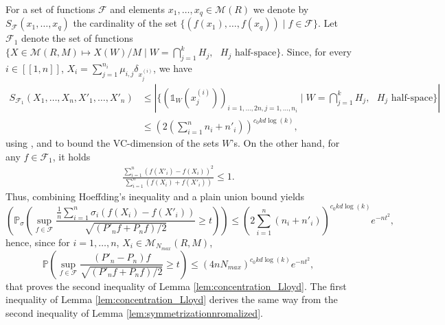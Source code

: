 \documentclass[noinfoline,preprint]{article}
\renewcommand{\1}{\mathds 1}
\begin{document}
For a set of functions $\mathcal{F}$ and elements $x_1, \hdots, x_q \in \mathcal{M}(R)$ we denote by $S_{\mathcal{F}}(x_1, \hdots, x_q)$ the cardinality of the set $\{ (f(x_1), \hdots, f(x_q))\mid f \in \mathcal{F} \}$.  Let $\mathcal{F}_1$ denote the set of functions $\{X \in \mathcal{M}(R,M) \mapsto X(W)/M \mid W= \bigcap_{j=1}^k H_j, \mbox{ $H_j$ half-space} \}$. Since, for every $i \in [\![1,n]\!]$, $X_i = \sum_{j=1}^{n_i} \mu_{i,j} \delta_{x^{(i)}_j}$, we have 
\begin{align*}
S_{\mathcal{F}_1}(X_1, \hdots, X_n, X'_1, \hdots, X'_n) & \leq |\{(\mathds{1}_W(x^{(i)}_j))_{i=1, \hdots, 2n, j=1, \hdots, n_i} \mid W= \bigcap_{j=1}^k H_j, \mbox{ $H_j$ half-space} \}| \\ 
& \leq \left ( 2 \left ( \sum_{i=1}^n n_i + n'_i \right ) \right )^{c_0 kd \log(k)},
\end{align*}
using \cite[Theorem 1]{Mendelson03}, and \cite[Theorem 1]{vanderVaart09} to bound the VC-dimension of the sets $W$'s. On the other hand, for any $f \in \mathcal{F}_1$, it holds
\begin{align*}
\frac{\sum_{i=1}^n (f(X'_i) - f(X_i))^2}{\sum_{i=1}^n (f(X_i) + f(X'_i))} \leq 1. 
\end{align*}
Thus, combining Hoeffding's inequality and a plain union bound yields
\[
\left ( \mathbb{P}_{\sigma} \left ( \sup_{f \in \mathcal{F} } \frac{\frac{1}{n} \sum_{i=1}^n{\sigma_i (f(X_i) - f(X'_i))}}{\sqrt{(P'_n f + P_nf)/2}} \geq t \right ) \right ) \leq \left ( 2 \sum_{i=1}^n(n_i + n'_i) \right )^{c_0 kd \log(k)} e^{-nt^2},
\]
hence, since for $i=1, \hdots, n$, $X_i \in \mathcal{M}_{N_{max}}(R,M)$,
\[
\mathbb{P} \left ( \sup_{f \in \mathcal{F} } \frac{(P'_n-P_n)f}{\sqrt{(P'_n f + P_nf)/2}} \geq t \right ) \leq (4 n N_{max})^{c_0 kd \log(k)} e^{-nt^2},
\]
that proves the second inequality of Lemma \ref{lem:concentration_Lloyd}. The first inequality of Lemma \ref{lem:concentration_Lloyd} derives the same way from the second inequality of Lemma \ref{lem:symmetrizationnromalized}.
\end{document}
